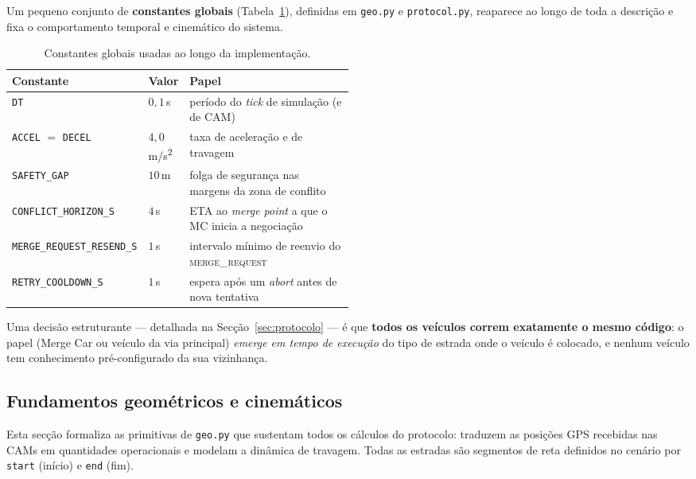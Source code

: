 \documentclass[11pt,a4paper]{article}
\begin{document}
Um pequeno conjunto de \textbf{constantes globais} (Tabela~\ref{tab:constantes}), definidas
em \texttt{geo.py} e \texttt{protocol.py}, reaparece ao longo de toda a descrição e fixa o
comportamento temporal e cinemático do sistema.

\begin{table}[H]
  \centering
  \small
  \renewcommand{\arraystretch}{1.2}
  \begin{tabular}{@{}llp{0.5\linewidth}@{}}
    \toprule
    \textbf{Constante} & \textbf{Valor} & \textbf{Papel} \\
    \midrule
    \texttt{DT}                        & $0{,}1$\,s   & período do \emph{tick} de simulação (e de CAM) \\
    \texttt{ACCEL} $=$ \texttt{DECEL}  & $4{,}0$\,m/s\textsuperscript{2} & taxa de aceleração e de travagem \\
    \texttt{SAFETY\_GAP}               & $10$\,m      & folga de segurança nas margens da zona de conflito \\
    \texttt{CONFLICT\_HORIZON\_S}      & $4$\,s       & ETA ao \emph{merge point} a que o MC inicia a negociação \\
    \texttt{MERGE\_REQUEST\_RESEND\_S} & $1$\,s       & intervalo mínimo de reenvio do \textsc{merge\_request} \\
    \texttt{RETRY\_COOLDOWN\_S}        & $1$\,s       & espera após um \emph{abort} antes de nova tentativa \\
    \bottomrule
  \end{tabular}
  \caption{Constantes globais usadas ao longo da implementação.}
  \label{tab:constantes}
\end{table}

Uma decisão estruturante --- detalhada na Secção~\ref{sec:protocolo} --- é que
\textbf{todos os veículos correm exatamente o mesmo código}: o papel (Merge Car ou veículo
da via principal) \emph{emerge em tempo de execução} do tipo de estrada onde o veículo é
colocado, e nenhum veículo tem conhecimento pré-configurado da sua vizinhança.

\subsection{Fundamentos geométricos e cinemáticos}
\label{sec:fundamentos}

Esta secção formaliza as primitivas de \texttt{geo.py} que sustentam todos os cálculos do
protocolo: traduzem as posições GPS recebidas nas CAMs em quantidades operacionais e
modelam a dinâmica de travagem. Todas as estradas são segmentos de reta definidos no
cenário por \texttt{start} (início) e \texttt{end} (fim).
\end{document}
